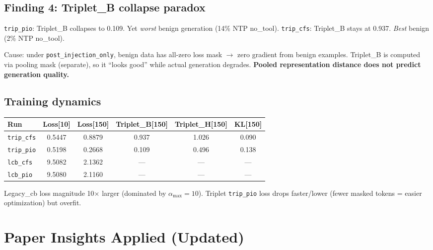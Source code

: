 \documentclass[11pt]{article}
\begin{document}
\subsection{Finding 4: Triplet\_B collapse paradox}
\texttt{trip\_pio}: Triplet\_B collapses to 0.109. Yet \emph{worst} benign generation (14\% NTP no\_tool).
\texttt{trip\_cfs}: Triplet\_B stays at 0.937. \emph{Best} benign (2\% NTP no\_tool).

Cause: under \texttt{post\_injection\_only}, benign data has all-zero loss mask $\to$ zero gradient from benign examples. Triplet\_B is computed via pooling mask (separate), so it ``looks good'' while actual generation degrades. \textbf{Pooled representation distance does not predict generation quality.}

\subsection{Training dynamics}
\begin{tabular}{lccccc}
\toprule
Run & Loss[10] & Loss[150] & Triplet\_B[150] & Triplet\_H[150] & KL[150] \\
\midrule
\texttt{trip\_cfs} & 0.5447 & 0.8879 & 0.937 & 1.026 & 0.090 \\
\texttt{trip\_pio} & 0.5198 & 0.2668 & 0.109 & 0.496 & 0.138 \\
\texttt{lcb\_cfs}  & 9.5082 & 2.1362 & --- & --- & --- \\
\texttt{lcb\_pio}  & 9.5080 & 2.1160 & --- & --- & --- \\
\bottomrule
\end{tabular}

Legacy\_cb loss magnitude 10$\times$ larger (dominated by $\alpha_\mathrm{max}=10$). Triplet \texttt{trip\_pio} loss drops faster/lower (fewer masked tokens = easier optimization) but overfit.

\section{Paper Insights Applied (Updated)}
\end{document}
